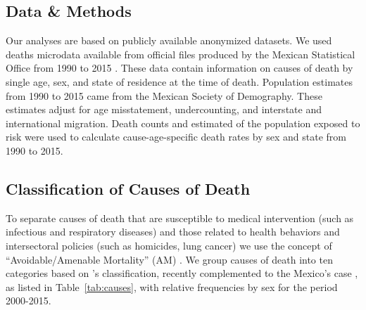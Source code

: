 \documentclass[11.5pt]{article}
\begin{document}
\begin{spacing}{1.5}
\section*{Data \& Methods} 
Our analyses are based on publicly available anonymized datasets. We used deaths microdata available from official files produced by the
Mexican Statistical Office from 1990 to 2015 \citep{INEGI}. These data contain
information on causes of death by single age, sex, and state of residence at the
time of death. Population estimates from 1990 to 2015 came from the Mexican Society of Demography. These estimates adjust for age misstatement, undercounting, and interstate and international migration. Death counts and estimated of the population exposed to risk were used to calculate cause-age-specific death rates by sex and state from 1990 to 2015.

\subsection*{Classification of Causes of Death}

To separate causes of death that are susceptible to medical intervention (such as
infectious and respiratory diseases) and those related to health behaviors and
intersectoral policies (such as homicides, lung cancer) we use the concept of
``Avoidable/Amenable Mortality'' (AM) \citep{nolte&mckee2004, nolte&mckee2008}. We group causes of death into ten categories based on \citet{elo2014}'s classification, recently complemented to the  Mexico's case \citep{Aburto2015}, as listed in Table~\ref{tab:causes}, with relative frequencies by sex for the period 2000-2015.


\end{spacing}
\end{document}
